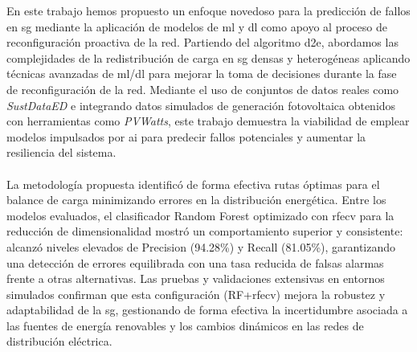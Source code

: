 En este trabajo hemos propuesto un enfoque novedoso para la predicción de fallos en \gls{sg} mediante la aplicación de modelos de \gls{ml} y \gls{dl} como apoyo al proceso de reconfiguración proactiva de la red. Partiendo del algoritmo \gls{d2e}, abordamos las complejidades de la redistribución de carga en \gls{sg} densas y heterogéneas aplicando técnicas avanzadas de \gls{ml}/\gls{dl} para mejorar la toma de decisiones durante la fase de reconfiguración de la red. Mediante el uso de conjuntos de datos reales como \textit{SustDataED} e integrando datos simulados de generación fotovoltaica obtenidos con herramientas como \textit{PVWatts}, este trabajo demuestra la viabilidad de emplear modelos impulsados por \gls{ai} para predecir fallos potenciales y aumentar la resiliencia del sistema.\\
\\
La metodología propuesta identificó de forma efectiva rutas óptimas para el balance de carga minimizando errores en la distribución energética. Entre los modelos evaluados, el clasificador Random Forest optimizado con \gls{rfecv} para la reducción de dimensionalidad mostró un comportamiento superior y consistente: alcanzó niveles elevados de Precision (94.28\%) y Recall (81.05\%), garantizando una detección de errores equilibrada con una tasa reducida de falsas alarmas frente a otras alternativas. Las pruebas y validaciones extensivas en entornos simulados confirman que esta configuración (RF+\gls{rfecv}) mejora la robustez y adaptabilidad de la \gls{sg}, gestionando de forma efectiva la incertidumbre asociada a las fuentes de energía renovables y los cambios dinámicos en las redes de distribución eléctrica.